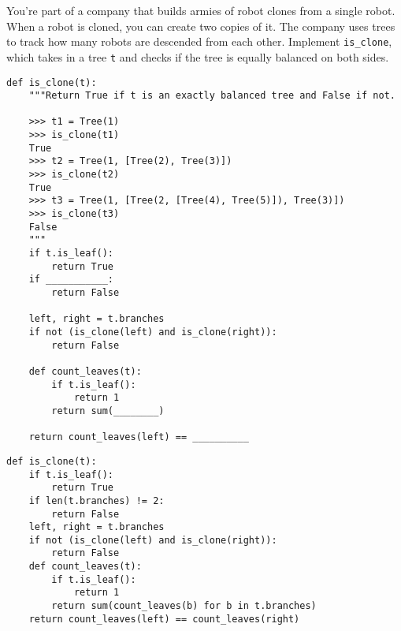 \begin{blocksection}
    \question You're part of a company that builds armies of robot clones from a single robot. When a robot is cloned, you can create two copies of it. The company uses trees to track how many robots are descended from each other.
    Implement \lstinline$is_clone$, which takes in a tree \lstinline$t$ and checks if the tree is equally balanced on both sides.

    \begin{lstlisting}
def is_clone(t):
    """Return True if t is an exactly balanced tree and False if not.

    >>> t1 = Tree(1)
    >>> is_clone(t1)
    True
    >>> t2 = Tree(1, [Tree(2), Tree(3)])
    >>> is_clone(t2)
    True
    >>> t3 = Tree(1, [Tree(2, [Tree(4), Tree(5)]), Tree(3)])
    >>> is_clone(t3)
    False
    """
    if t.is_leaf():
        return True
    if ___________:
        return False
    
    left, right = t.branches
    if not (is_clone(left) and is_clone(right)):
        return False
    
    def count_leaves(t):
        if t.is_leaf():
            return 1
        return sum(________)
    
    return count_leaves(left) == __________
    \end{lstlisting}

    \begin{solution}[0.7in]
    \begin{lstlisting}
def is_clone(t):
    if t.is_leaf():
        return True
    if len(t.branches) != 2:
        return False
    left, right = t.branches
    if not (is_clone(left) and is_clone(right)):
        return False
    def count_leaves(t):
        if t.is_leaf():
            return 1
        return sum(count_leaves(b) for b in t.branches)
    return count_leaves(left) == count_leaves(right)
    \end{lstlisting}
    \end{solution}
\end{blocksection}
